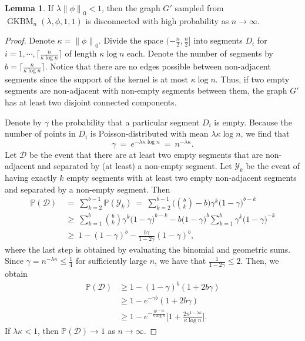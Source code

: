 \documentclass[letterpaper,11pt]{article}
\newtheorem{lem}[thm]{Lemma}
\theoremstyle{definition}
\def\P{\mathbb{P}}
\def\cD{\mathcal{D}}
\def\cY{\mathcal{Y}}
\def\weq{ \ = \ }
\def\wge{ \ \ge \ }
\newcommand{\zeronorm}[1]{{\lVert#1\rVert}_0}
\numberwithin{equation}{section}
\newcommand{\GKBM}{\operatorname{GKBM}}
\newcommand{\ga}{\gamma}
\newcommand{\ka}{\kappa}
\newcommand{\la}{\lambda}
\newtheorem{lem}[thm]{Lemma}
\theoremstyle{definition}
\def\P{\mathbb{P}}
\def\cD{\mathcal{D}}
\def\cY{\mathcal{Y}}
\def\weq{ \ = \ }
\def\wge{ \ \ge \ }
\newcommand{\zeronorm}[1]{{\lVert#1\rVert}_0}
\numberwithin{equation}{section}
\newcommand{\GKBM}{\operatorname{GKBM}}
\newcommand{\ga}{\gamma}
\newcommand{\ka}{\kappa}
\newcommand{\la}{\lambda}
\theoremstyle{thmstyletwo}%
\begin{document}
\begin{lem}
If $\la \zeronorm{\phi} < 1$, then the graph $G'$ sampled from 
$\GKBM_n(\la, \phi, 1, 1)$ is disconnected with high probability as $n \to \infty$.
\label{lem:connectivity_softrgg}
\end{lem}
\begin{proof}
Denote $\ka = \zeronorm{\phi}$.
Divide the space $(-\frac{n}{2}, \frac{n}{2}]$ into segments $D_i$ for $i=1,\cdots, \lceil\frac{n}{\ka \log n}\rceil$ of length $\ka \log n$ each. Denote the number of segments by $b = \lceil\frac{n}{\ka \log n}\rceil$. 
Notice that there are no edges possible between non-adjacent segments since the support of the kernel is at most $\ka \log n$. Thus, if two empty segments are non-adjacent with non-empty segments between them, the graph $G'$ has at least two disjoint connected components. 


Denote by $\ga$ the probability that
a particular segment $D_i$ is empty.
Because the number of points in $D_i$ is Poisson-distributed with mean $\la \ka \log n$, we find that
\begin{equation}
 \ga
 \weq e^{-\la \ka \log n}
 \weq n^{-\la \ka}.
 \label{eq:empty_block_prob}
\end{equation}
Let $\cD$ be the event that there are at least two empty segments that are non-adjacent and separated by (at least) a non-empty segment. Let $\cY_k$ be the event of having exactly $k$ empty segments with at least two empty non-adjacent segments and separated by a non-empty segment.
Then
\begin{align*}
\P(\cD) & \weq \sum_{k=2}^{b-1} \P(\cY_k) \weq \sum_{k=2}^{b-1} \Bigg(\binom{b}{k} -b\Bigg) \ga^k \big(1-\ga\big)^{b-k} \\
&\wge \sum_{k=1}^{b} \binom{b}{k} \ga^k \big(1-\ga \big)^{b-k} - b\big(1-\ga\big)^{b}\sum_{k=1}^{b} \ga^k \big(1-\ga\big)^{-k}\\
&\wge 1-(1-\ga )^{b} -\frac{b\ga}{1-2\ga}(1-\ga )^{b},
\end{align*}
where the last step is obtained by evaluating the binomial and geometric sums. Since $\ga = n^{-\la \ka } \le \frac{1}{4}$ for sufficiently large $n$, we have that $\frac{1}{1-2\ga} \le 2$. Then, we obtain  
\begin{align*}
\P(\cD)
&\ge 1-(1-\ga)^{b} (1+2b\ga)\\
& \ge  1- e^{-\ga b}(1+2b\ga)\\
&\ge 1-e^{-\frac{n^{1-\la \ka}}{\ka \log n}} \Big[1+ \frac{2n^{1-\la \ka}}{\ka \log n}\Big].
\end{align*}
If $\la \ka <1$, then $\P(\cD) \rightarrow 1$ as $n\rightarrow \infty$.  
\end{proof}
\end{document}
